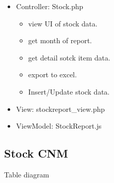 \documentclass[letterpaper,10pt,english,openany,oneside]{sphinxmanual}
\begin{document}
\begin{itemize}
\item {} 
\sphinxAtStartPar
Controller: Stock.php
\begin{itemize}
\item {} 
\sphinxAtStartPar
{} view UI of stock data.

\item {} 
\sphinxAtStartPar
{} get month of report.

\item {} 
\sphinxAtStartPar
{} get detail sotck item data.

\item {} 
\sphinxAtStartPar
{} export to excel.

\item {} 
\sphinxAtStartPar
{} Insert/Update stock data.

\end{itemize}

\begin{sphinxVerbatim}[commandchars=\\\{\}]
   
 
\end{sphinxVerbatim}

\item {} 
\sphinxAtStartPar
View: stockreport\_view.php

\item {} 
\sphinxAtStartPar
ViewModel: StockReport.js

\end{itemize}


\subsection{Stock CNM}
\label{\detokenize{module/module:stock-cnm}}
\sphinxAtStartPar
Table diagram
\end{document}
